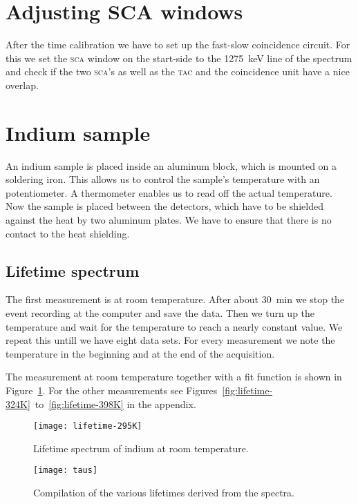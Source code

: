 \documentclass[11pt, english, fleqn, DIV=15, headinclude, BCOR=2cm]{scrreprt}
\begin{document}
\section{Adjusting SCA windows}

After the time calibration we have to set up the fast-slow coincidence
circuit. For this we set the \textsc{sca} window on the start-side
to the \SI{1275}{\kilo\electronvolt} line of the spectrum and check if the
two \textsc{sca}'s as well as the \textsc{tac} and the coincidence unit have
a nice overlap.

\section{Indium sample}

An indium sample is placed inside an aluminum block, which is mounted on a
soldering iron. This allows us to control the sample's temperature with an
potentiometer. A thermometer enables us to read off the actual temperature. Now
the sample is placed between the detectors, which have to be shielded against
the heat by two aluminum plates. We have to ensure that there is no contact to
the heat shielding. 

\subsection{Lifetime spectrum}

The first measurement is at room temperature. After about \SI{30}{\minute} we
stop the event recording at the computer and save the data. Then we turn up the
temperature and wait for the temperature to reach a nearly
constant value. We repeat this untill we have eight data sets. For every
measurement we note the temperature in the beginning and at the end of the
acquisition.

The measurement at room temperature together with a fit function is shown in
Figure~\ref{fig:lifetime-295K}. For the other measurements see
Figures~\ref{fig:lifetime-324K}~to~\ref{fig:lifetime-398K} in the appendix.

\begin{figure}
    \centering
    \texttt{[image: lifetime-295K]}
    \caption{%
        Lifetime spectrum of indium at room temperature.
    }
    \label{fig:lifetime-295K}
\end{figure}

\begin{figure}
    \centering
    \texttt{[image: taus]}
    \caption{%
        Compilation of the various lifetimes derived from the spectra.
    }
    \label{fig:taus}
\end{figure}
\end{document}
